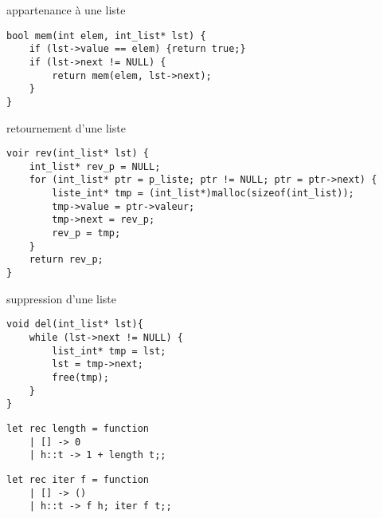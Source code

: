 \begin{fnc*}{appartenance à une liste}
\begin{verbatim}
bool mem(int elem, int_list* lst) {
    if (lst->value == elem) {return true;}
    if (lst->next != NULL) {
        return mem(elem, lst->next);
    }
}
\end{verbatim}
\end{fnc*}
\begin{fnc*}{retournement d'une liste}
\begin{verbatim}
voir rev(int_list* lst) {
    int_list* rev_p = NULL;
    for (int_list* ptr = p_liste; ptr != NULL; ptr = ptr->next) {
        liste_int* tmp = (int_list*)malloc(sizeof(int_list));
        tmp->value = ptr->valeur;
        tmp->next = rev_p;
        rev_p = tmp;
    }
    return rev_p;
}
\end{verbatim}
\end{fnc*}
\begin{fnc*}{suppression d'une liste}
\begin{verbatim}
void del(int_list* lst){
    while (lst->next != NULL) {
        list_int* tmp = lst;
        lst = tmp->next;
        free(tmp);
    }
}
\end{verbatim}
\end{fnc*}
\begin{imp*}{}
\begin{verbatim}
let rec length = function
    | [] -> 0
    | h::t -> 1 + length t;;
\end{verbatim}
\end{imp*}
\begin{imp*}{}
\begin{verbatim}
let rec iter f = function
    | [] -> ()
    | h::t -> f h; iter f t;;
\end{verbatim}
\end{imp*}
